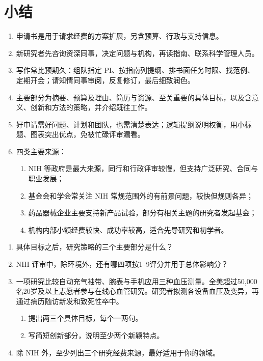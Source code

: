 \section{小结}
\begin{enumerate}
\item 申请书是用于请求经费的方案扩展，另含预算、行政与支持信息。
\item 新研究者先咨询资深同事，决定问题与机构，再读指南、联系科学管理人员。
\item 写作常比预期久：组队指定 PI、按指南列提纲、排书面任务时限、找范例、定期开会；请知情同事审阅，反复修订，最后细致润色。
\item 主要部分为摘要、预算及理由、简历与资源、至关重要的具体目标，以及含意义、创新和方法的策略，并介绍既往工作。
\item 好申请需好问题、计划和团队，也需清楚表达；逻辑提纲说明权衡，用小标题、图表突出优点，免被忙碌评审漏看。
\item 四类主要来源：
\begin{enumerate}
\item NIH 等政府是最大来源，同行和行政评审较慢，但支持广泛研究、合同与职业发展；
\item 基金会和学会常关注 NIH 常规范围外的有前景问题，较快但规则各异；
\item 药品器械企业主要支持新产品试验，部分有相关主题的研究者发起基金；
\item 机构内部小额经费较快、成功率较高，适合先导研究和初学者。
\end{enumerate}
\end{enumerate}

\clearpage
{}
\begin{enumerate}
\item 具体目标之后，研究策略的三个主要部分是什么？
\item NIH 评审中，除环境外，还有哪四项按1--9评分并用于总体影响分？
\item 一项研究比较自动充气袖带、腕表与手机应用三种血压测量。全美超过50,000名20岁及以上志愿者参与在线心血管研究。研究者拟测各设备血压及变异，再通过病历随访新发和致死性卒中。
\begin{enumerate}
\item 提出两三个具体目标，每个一两句。
\item 写简短创新部分，说明至少两个新颖特点。
\end{enumerate}
\item 除 NIH 外，至少列出三个研究经费来源，最好适用于你的领域。
\end{enumerate}
